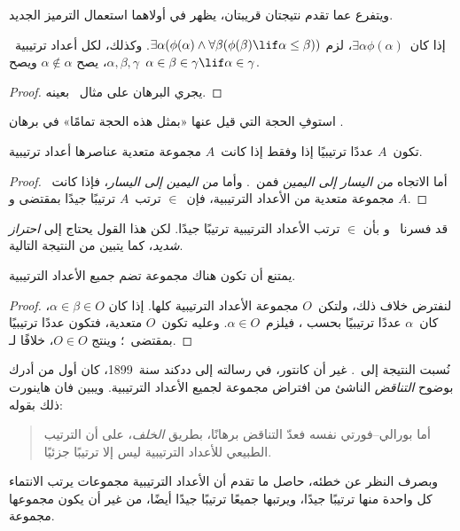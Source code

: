 \documentclass[../../../include/open-logic-section]{subfiles}
\begin{document}
ويتفرع عما تقدم نتيجتان قريبتان، يظهر في أولاهما استعمال الترميز الجديد.

\begin{cor}
إذا كان~$\exists \alpha\phi(\alpha)$، لزم
$\exists \alpha(\phi(\alpha) \land \forall \beta(\phi(\beta) \lif \alpha \leq \beta))$.
وكذلك، لكل أعداد ترتيبية~$\alpha, \beta, \gamma$، يصح
$\alpha \notin \alpha$ ويصح~$\alpha \in \beta \in \gamma \lif \alpha \in \gamma$.
\end{cor}

\begin{proof}
يجري البرهان على مثال~ بعينه.
\end{proof}

\begin{prob}
استوفِ الحجة التي قيل عنها «بمثل هذه الحجة تمامًا» في برهان
.
\end{prob}

\begin{cor}
تكون~$A$ عددًا ترتيبيًا إذا وفقط إذا كانت~$A$ مجموعة متعدية عناصرها
أعداد ترتيبية.
\end{cor}

\begin{proof}
أما الاتجاه \emph{من اليسار إلى اليمين} فمن~.
وأما \emph{من اليمين إلى اليسار}، فإذا كانت~$A$ مجموعة متعدية من
الأعداد الترتيبية، فإن~$\in$ ترتب~$A$ ترتيبًا جيدًا بمقتضى
 و.
\end{proof}

قد فسرنا~ و بأن
$\in$ ترتب الأعداد الترتيبية ترتيبًا جيدًا. لكن هذا القول يحتاج إلى
\emph{احتراز شديد}، كما يتبين من النتيجة التالية.

\begin{thm}
يمتنع أن تكون هناك مجموعة تضم جميع الأعداد الترتيبية.
\end{thm}

\begin{proof}
لنفترض خلاف ذلك، ولتكن~$O$ مجموعة الأعداد الترتيبية كلها. إذا كان
$\alpha \in \beta \in O$، كان~$\alpha$ عددًا ترتيبيًا بحسب
، فيلزم~$\alpha \in O$. وعليه تكون~$O$ متعدية،
فتكون عددًا ترتيبيًا بمقتضى~؛ وينتج
$O \in O$، خلافًا لـ.
\end{proof}
\noindent
نُسبت النتيجة إلى~\citeauthor{Burali-Forti1897}. غير أن كانتور، في
رسالته إلى ددكند سنة~1899، كان أول من أدرك بوضوح \emph{التناقض}
الناشئ من افتراض مجموعة لجميع الأعداد الترتيبية. ويبين فان هاينورت ذلك بقوله:
\begin{quote}
أما بورالي--فورتي نفسه فعدّ التناقض برهانًا، بطريق \emph{الخلف}،
على أن الترتيب الطبيعي للأعداد الترتيبية ليس إلا ترتيبًا جزئيًا.
\citep[p.~105]{Heijenoort1967}
\end{quote}
وبصرف النظر عن خطئه، حاصل ما تقدم أن الأعداد الترتيبية مجموعات
يرتب الانتماء كل واحدة منها ترتيبًا جيدًا، ويرتبها جميعًا ترتيبًا
جيدًا أيضًا، من غير أن يكون مجموعها مجموعة.
\end{document}
